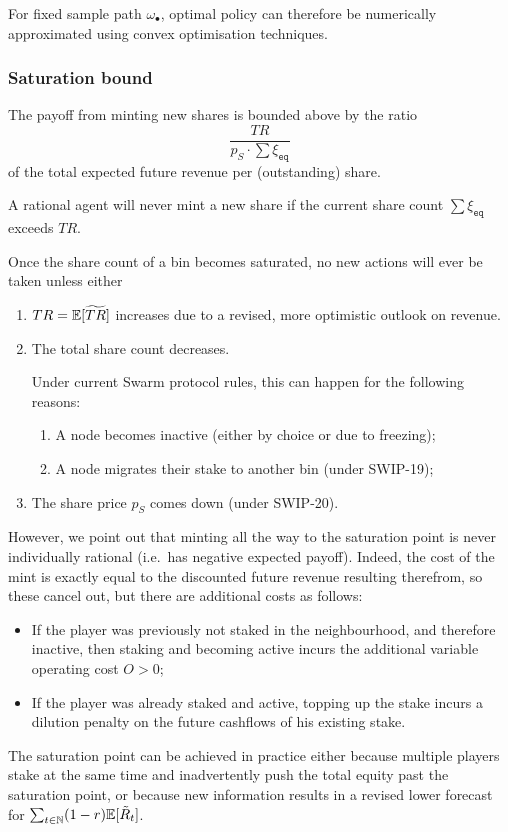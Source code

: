 For fixed sample path $\omega_\bullet$, optimal policy can therefore be numerically approximated using convex optimisation techniques.


\subsubsection{Saturation bound}
\label{section:saturation}
The payoff from minting new shares is bounded above by the ratio
\[
  \frac{TR}{p_S\cdot\sum \xi_\mathtt{eq}}
\]
of the total expected future revenue per (outstanding) share.

\begin{proposition*}

  A rational agent will never mint a new share if the current share count $\sum \xi_\mathtt{eq}$ exceeds $TR$.

\end{proposition*}

Once the share count of a bin becomes saturated, no new actions will ever be taken unless either
\begin{enumerate}
  \item $TR=\mathbb{E}[\widetilde{TR}]$ increases due to a revised, more optimistic outlook on revenue.
  \item The total share count decreases. 
  
    Under current Swarm protocol rules, this can happen for the following reasons:
  \begin{enumerate}
    \item A node becomes inactive (either by choice or due to freezing);
    \item A node migrates their stake to another bin (under SWIP-19);
  \end{enumerate}
  \item The share price $p_S$ comes down (under SWIP-20).
\end{enumerate}

However, we point out that minting all the way to the saturation point is never individually rational (i.e.~has negative expected payoff).
%
Indeed, the cost of the mint is exactly equal to the discounted future revenue resulting therefrom, so these cancel out, but there are additional costs as follows:
\begin{itemize}
  \item If the player was previously not staked in the neighbourhood, and therefore inactive, then staking and becoming active incurs the additional variable operating cost $O>0$;
  \item If the player was already staked and active, topping up the stake incurs a dilution penalty on the future cashflows of his existing stake.
\end{itemize}
%
The saturation point can be achieved in practice either because multiple players stake at the same time and inadvertently push the total equity past the saturation point, or because new information results in a revised lower forecast for $\sum_{t\in\mathbb{N}}(1-r)\mathbb{E}[\tilde R_t]$.

